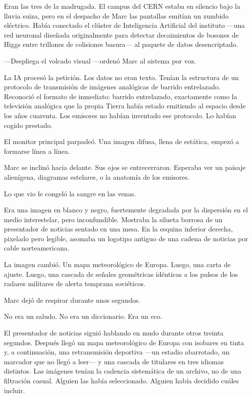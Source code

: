 \documentclass[11pt,a5paper,twoside]{book}
\begin{document}
Eran las tres de la madrugada. El campus del CERN estaba en silencio bajo la lluvia suiza, pero en el despacho de Marc las pantallas emitían un zumbido eléctrico. Había conectado el clúster de Inteligencia Artificial del instituto —una red neuronal diseñada originalmente para detectar decaimientos de bosones de Higgs entre trillones de colisiones basura— al paquete de datos desencriptado.

—Despliega el volcado visual —ordenó Marc al sistema por voz.

La IA procesó la petición. Los datos no eran texto. Tenían la estructura de un protocolo de transmisión de imágenes analógicas de barrido entrelazado. Reconoció el formato de inmediato: barrido entrelazado, exactamente como la televisión analógica que la propia Tierra había estado emitiendo al espacio desde los años cuarenta. Los emisores no habían inventado ese protocolo. Lo habían cogido prestado.

El monitor principal parpadeó. Una imagen difusa, llena de estática, empezó a formarse línea a línea.

Marc se inclinó hacia delante. Sus ojos se entrecerraron. Esperaba ver un paisaje alienígena, diagramas estelares, o la anatomía de los emisores.

Lo que vio le congeló la sangre en las venas.

Era una imagen en blanco y negro, fuertemente degradada por la dispersión en el medio interestelar, pero inconfundible. Mostraba la silueta borrosa de un presentador de noticias sentado en una mesa. En la esquina inferior derecha, pixelado pero legible, asomaba un logotipo antiguo de una cadena de noticias por cable norteamericana.

La imagen cambió. Un mapa meteorológico de Europa. Luego, una carta de ajuste. Luego, una cascada de señales geométricas idénticas a los pulsos de los radares militares de alerta temprana soviéticos.

Marc dejó de respirar durante unos segundos.

No era un saludo. No era un diccionario. Era un eco.

El presentador de noticias siguió hablando en mudo durante otros treinta segundos. Después llegó un mapa meteorológico de Europa con isobares en tinta y, a continuación, una retransmisión deportiva —un estadio abarrotado, un marcador que no llegó a leer— y una cascada de titulares en tres idiomas distintos. Las imágenes tenían la cadencia sistemática de un archivo, no de una filtración casual. Alguien las había seleccionado. Alguien había decidido cuáles incluir.
\end{document}
